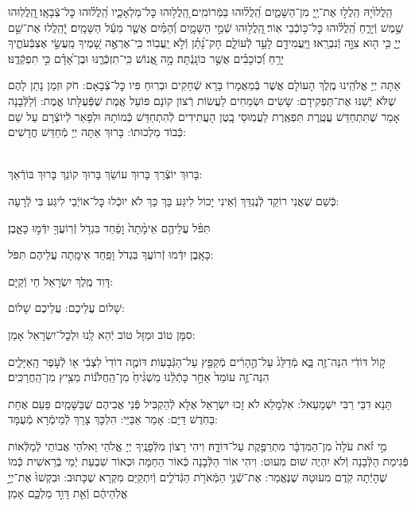 \documentclass[twoside, openany, parskip=half, 11pt]{book}
\begin{document}
הַֽלֲלוּ֙יָהּ הַֽלֲל֣וּ אֶת־יְ֖יָ מִן־הַשָּׁמַ֑יִם הַֽ֝לֲל֗וּהוּ בַּמְּֿרוֹמִֽים׃
֭הַֽלֲל֥וּהוּ כׇּל־מַלְאָכָ֑יו הַֽ֝לֲל֗וּהוּ כׇּל־צְֿבָאָֽו׃
֖הַֽלֲלֽוּהוּ שֶׁ֣מֶשׁ וְֿיָרֵ֑חַ הַֽ֝לֲל֗וּהוּ כׇּל־כּ֥וֹכְֿבֵי אֽוֹר׃
֖הַֽלֲל֥וּהוּ שְֿׁמֵ֣י הַשָּׁמָ֑יִם וְֿ֝הַמַּ֗יִם אֲשֶׁ֤ר מֵעַ֬ל הַשָּׁמָֽיִם׃
יְֿ֭הַֽלֲלוּ אֶת־שֵׁ֣ם יְיָ֑ כִּ֤י ה֖וּא צִוָּ֣ה וְֿנִבְרָֽאוּ׃
וַיַּֽעֲמִידֵ֣ם לָעַ֣ד לְֿעוֹלָ֑ם חָק־נָ֝תַ֗ן וְֿלֹ֣א יַֽעֲבֽוֹר׃
כִּֽי־אֶרְאֶ֣ה שָׁ֭מֶיךָ מַֽעֲשֵׂ֣י אֶצְבְּֿעֹתֶ֑יךָ יָרֵ֥חַ וְֿ֝כֽוֹכָבִ֗ים אֲשֶׁ֣ר כּוֹנָֽנְֿתָּה׃
מָ֣ה אֱ֭נוֹשׁ כִּֽי־תִזְכְּֿרֶ֑נּוּ וּבֶן־אָ֝דָ֗ם כִּ֣י תִפְקְֿדֶֽנּוּ׃

אַתָּה יְיָ אֱלֹהֵֽינוּ מֶֽלֶךְ הָעוֹלָם אֲשֶׁר בְּֿמַאֲמָרוֹ בָּרָא שְֿׁחָקִים וּבְרֽוּחַ פִּיו כׇּל־צְֿבָאָם: חֹק וּזְמַן נָתַן לָהֶם שֶׁלֹּא יְֿשַׁנּוּ אֶת־תַּפְקִידָם: שָׂשִׂים וּשְׂמֵחִים לַעֲשׂוֹת רְֿצוֹן קוֹנָם פּוֹעֵל אֱמֶת שֶׁפְּֿעֻלָּתוֹ אֱמֶת: וְֿלַלְּֿבָנָה אָמַר שֶׁתִּתְחַדֵּשׁ עֲטֶֽרֶת תִּפְאֶֽרֶת לַעֲמֽוּסֵי בָֽטֶן הָעֲתִידִים לְֿהִתְחַדֵּשׁ כְּֿמוֹתָהּ וּלְפָאֵר לְֿיוֹצְֿרָם עַל שֵׁם כְּֿבוֹד מַלְכוּתוֹ: בָּרוּךְ אַתָּה יְיָ מְֿחַדֵּשׁ חֳדָשִׁים:

\\
בָּרוּךְ יוֹצְֿרֵךְ בָּרוּךְ עוֹשֵׂךְ בָּרוּךְ קוֹנֵךְ בָּרוּךְ בּוֹרְֿאֵךְ:

כְּֿשֵׁם שֶׁאֲנִי רוֹקֵד לְֿנֶגְדֵּךְ וְֿאֵינִי יָכוֹל לִיגַּע בָּךְ
כַּךְ לֹא יוּכְֿלוּ כׇּל־אוֹיְֿבַי לִיגַּע בִּי לְֿרָעָה:

תִּפֹּ֨ל עֲלֵיהֶ֤ם אֵימָ֨תָה֙ וָפַ֔חַד בִּגְדֹ֥ל זְֿרֽוֹעֲךָ֖ יִדְּֿמ֣וּ כָּאָ֑בֶן׃


כָּאָֽבֶן יִדְּֿמוּ זְֿרוֹעֲךָ בִּגְדֹל וָפַֽחַד אֵימָֽתָה עֲלֵיהֶם תִּפֹּל:


דָּוִד מֶֽלֶךְ יִשְׂרָאֵל חַי וְֿקַיָּם:

שָׁלוֹם עֲלֵיכֶם: \qquad {}
עֲלֵיכֶם שָׁלוֹם:


סִמָּן טוֹב וּמַזָּל טוֹב יְֿהֵא לָֽנוּ וּלְכׇל־יִשְׂרָאֵל אָמֵן:

ק֣וֹל דּוֹדִ֔י הִנֵּה־זֶ֖ה בָּ֑א מְֿדַלֵּג֙ עַל־הֶ֣הָרִ֔ים מְֿקַפֵּ֖ץ עַל־הַגְּֿבָעֽוֹת׃ דּוֹמֶ֤ה דוֹדִי֙ לִצְבִ֔י א֖וֹ לְֿעֹ֣פֶר הָֽאַיָּלִ֑ים הִנֵּה־זֶ֤ה עוֹמֵד֙ אַחַ֣ר כָּתְֿלֵ֔נוּ מַשְׁגִּ֨יחַ֙ מִן־הַֽחֲלֹּנ֔וֹת מֵצִ֖יץ מִן־הַֽחֲרַכִּֽים׃

תָּנָא דִבֵּי רַבִּי יִשְׁמָעֵאל: אִלְמָלֵא לֹא זָכוּ יִשְׂרָאֵל אֶלָּא לְֿהַקְבִּיל פְּֿנֵי אֲבִיהֶם שֶׁבַּשָּׁמַֽיִם פַּעַם אֶחָת בַּחֹֽדֶשׁ דַּיָּם: אָמַר אַבַּיֵּי: הִלְכָּךְ צָרֵךְ לְֿמֵימְֿרָא מְֿעֻמָּד:

מִ֣י זֹ֗את עֹלָה֙ מִן־הַמִּדְבָּ֔ר מִתְרַפֶּ֖קֶת עַל־דּוֹדָ֑הּ׃
וִיהִי רָצוֹן מִלְּֿפָנֶֽיךָ יְיָ אֱלֹהַי וֵאלֹהֵי אֲבוֹתַי לְֿמַלְּֿאוֹת פְּֿגִימַת הַלְּֿבָנָה וְֿלֹא יִהְיֶה שׁוּם מִעוּט: וִיהִי אוֹר הַלְּֿבָנָה כְּֿאוֹר הַחַמָּה וּכְאוֹר שִׁבְעַת יְֿמֵי בְֿרֵאשִׁית כְּֿמוֹ שֶׁהָיְֿתָה קֹֽדֶם מִעוּטָהּ שֶׁנֶּאֱמַר:
אֶת־שְֿׁנֵ֥י הַמְּֿאֹרֹ֖ת הַגְּֿדֹלִ֑ים וְֿיִתְקַיַּם מִקְרָא שֶׁכָּתוּב: וּבִקְשׁוּ֙ אֶת־יְיָ֣ אֱלֹֽהֵיהֶ֔ם וְֿאֵ֖ת דָּוִ֣ד מַלְכָּ֑ם אָמֵן׃
\end{document}
